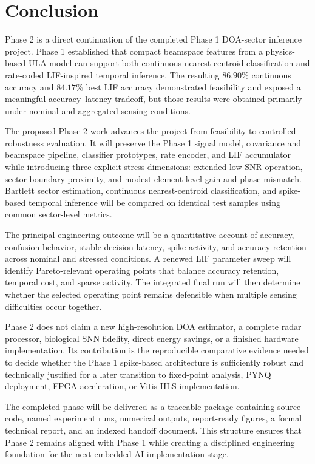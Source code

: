 \section{Conclusion}

Phase 2 is a direct continuation of the completed Phase 1 DOA-sector inference project. Phase 1 established that compact beamspace features from a physics-based ULA model can support both continuous nearest-centroid classification and rate-coded LIF-inspired temporal inference. The resulting $86.90\%$ continuous accuracy and $84.17\%$ best LIF accuracy demonstrated feasibility and exposed a meaningful accuracy--latency tradeoff, but those results were obtained primarily under nominal and aggregated sensing conditions.

The proposed Phase 2 work advances the project from feasibility to controlled robustness evaluation. It will preserve the Phase 1 signal model, covariance and beamspace pipeline, classifier prototypes, rate encoder, and LIF accumulator while introducing three explicit stress dimensions: extended low-SNR operation, sector-boundary proximity, and modest element-level gain and phase mismatch. Bartlett sector estimation, continuous nearest-centroid classification, and spike-based temporal inference will be compared on identical test samples using common sector-level metrics.

The principal engineering outcome will be a quantitative account of accuracy, confusion behavior, stable-decision latency, spike activity, and accuracy retention across nominal and stressed conditions. A renewed LIF parameter sweep will identify Pareto-relevant operating points that balance accuracy retention, temporal cost, and sparse activity. The integrated final run will then determine whether the selected operating point remains defensible when multiple sensing difficulties occur together.

Phase 2 does not claim a new high-resolution DOA estimator, a complete radar processor, biological SNN fidelity, direct energy savings, or a finished hardware implementation. Its contribution is the reproducible comparative evidence needed to decide whether the Phase 1 spike-based architecture is sufficiently robust and technically justified for a later transition to fixed-point analysis, PYNQ deployment, FPGA acceleration, or Vitis HLS implementation.

The completed phase will be delivered as a traceable package containing source code, named experiment runs, numerical outputs, report-ready figures, a formal technical report, and an indexed handoff document. This structure ensures that Phase 2 remains aligned with Phase 1 while creating a disciplined engineering foundation for the next embedded-AI implementation stage.